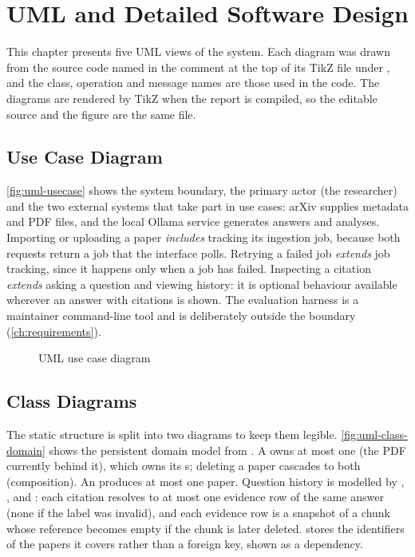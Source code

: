 \chapter{UML and Detailed Software Design}\label{ch:uml}

This chapter presents five UML views of the system. Each diagram was drawn from the source code named in the
comment at the top of its TikZ file under , and the class, operation and message names
are those used in the code. The diagrams are rendered by TikZ when the report is compiled, so the editable source
and the figure are the same file.

\section{Use Case Diagram}

\autoref{fig:uml-usecase} shows the system boundary, the primary actor (the researcher) and the two external
systems that take part in use cases: arXiv supplies metadata and PDF files, and the local Ollama service generates
answers and analyses. Importing or uploading a paper \emph{includes} tracking its ingestion job, because both
requests return a job that the interface polls. Retrying a failed job \emph{extends} job tracking, since it happens
only when a job has failed. Inspecting a citation \emph{extends} asking a question and viewing history: it is
optional behaviour available wherever an answer with citations is shown. The evaluation harness is a maintainer
command-line tool and is deliberately outside the boundary (\autoref{ch:requirements}).

\begin{figure}[htbp]
  \centering
  \caption{UML use case diagram}\label{fig:uml-usecase}
\end{figure}

\section{Class Diagrams}

The static structure is split into two diagrams to keep them legible. \autoref{fig:uml-class-domain} shows the
persistent domain model from . A  owns at most one  (the
PDF currently behind it), which owns its s; deleting a paper cascades to both (composition). An
 produces at most one paper. Question history is modelled by , ,
 and : each citation resolves to at most one evidence row of the same
answer (none if the label was invalid), and each evidence row is a snapshot of a chunk whose reference becomes
empty if the chunk is later deleted.  stores the identifiers of the papers it covers rather than a
foreign key, shown as a dependency.

